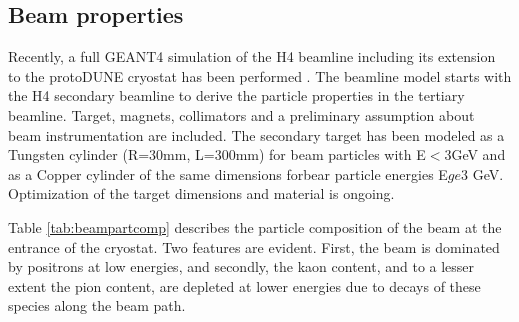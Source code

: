 \subsection{Beam properties}
Recently, a full GEANT4 simulation of the H4 beamline including its extension to the protoDUNE cryostat has been performed \cite{H4beamfiles}. 
The beamline model starts with the H4 secondary beamline 
to derive the particle properties in the tertiary beamline.  Target, magnets, collimators and a preliminary assumption
about beam instrumentation are included. The secondary target has been
modeled as a Tungsten cylinder (R=30mm, L=300mm) for beam particles with E$<3$GeV and as a Copper cylinder of the same dimensions  forbear particle energies  E$ge$3 GeV. Optimization of the target dimensions and material is ongoing.

Table \ref{tab:beampartcomp} describes the particle composition of the
beam at the entrance of the cryostat. Two features are evident. First, the beam is dominated by positrons at low energies,
and secondly, the kaon content, and to a lesser extent the pion content, are depleted at lower energies due to decays of these species 
along the beam path. 

